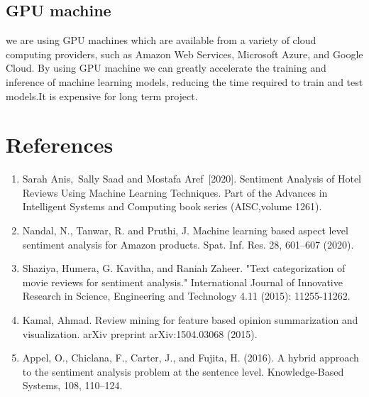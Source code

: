 \subsection{GPU machine}
we are using GPU machines which are  available from a variety of cloud computing providers, such as Amazon Web Services, Microsoft Azure, and Google Cloud. By using GPU machine we can greatly accelerate the training and inference of machine learning models, reducing the time required to train and test models.It is expensive for long term project.



\section{References}
\begin{enumerate}



\item Sarah Anis, Sally Saad and Mostafa Aref [2020].
Sentiment Analysis of Hotel Reviews Using Machine Learning Techniques. Part of the Advances in Intelligent Systems and Computing book series (AISC,volume 1261).
\item Nandal, N., Tanwar, R. and Pruthi, J. Machine learning based aspect level sentiment analysis for Amazon products. Spat. Inf. Res. 28, 601–607 (2020).
\item Shaziya, Humera, G. Kavitha, and Raniah Zaheer. "Text categorization of movie reviews for sentiment analysis." International Journal of Innovative Research in Science, Engineering and Technology 4.11 (2015): 11255-11262.


\item Kamal, Ahmad. Review mining for feature based opinion summarization and visualization. arXiv preprint arXiv:1504.03068 (2015).


\item Appel, O., Chiclana, F., Carter, J., and Fujita, H. (2016). A hybrid approach to the sentiment analysis problem at the sentence level. Knowledge-Based Systems, 108, 110–124.

\end{enumerate}


